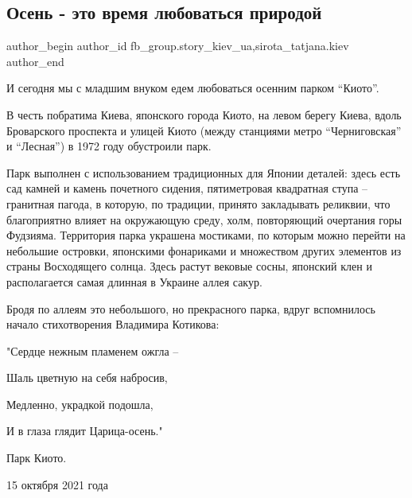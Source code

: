  
 
 
 
 
 
\subsection{Осень - это время  любоваться природой}
\label{sec:16_10_2021.fb.fb_group.story_kiev_ua.2.osenj_park_kioto}
 
\ifcmt
 author_begin
   author_id fb_group.story_kiev_ua,sirota_tatjana.kiev
 author_end
\fi

\begin{multicols}{2} %
\Large
\setlength{\parindent}{0pt}


И сегодня мы с младшим внуком едем любоваться осенним парком \enquote{Киото}.

В честь побратима Киева, японского города Киото, на левом берегу Киева, вдоль
Броварского проспекта и улицей Киото (между станциями метро \enquote{Черниговская} и
\enquote{Лесная}) в 1972  году обустроили парк.

Парк выполнен с использованием традиционных для Японии деталей: здесь есть сад
камней и камень почетного сидения, пятиметровая квадратная ступа – гранитная
пагода, в которую, по традиции, принято закладывать реликвии, что благоприятно
влияет на окружающую среду, холм, повторяющий очертания горы Фудзияма.
Территория парка украшена мостиками, по которым можно перейти на небольшие
островки, японскими фонариками и множеством других элементов из страны
Восходящего солнца. Здесь растут вековые сосны, японский клен и располагается
самая длинная в Украине аллея сакур.

Бродя по аллеям это небольшого, но прекрасного парка, вдруг вспомнилось начало
стихотворения Владимира Котикова:

"Сердце нежным пламенем ожгла –

Шаль цветную на себя набросив,

Медленно, украдкой подошла,

И в глаза глядит Царица-осень."

Парк Киото.

15 октября 2021 года 

\end{multicols} %

